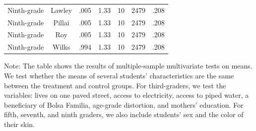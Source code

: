 \documentclass[
	article,			%
	12pt,				%
	oneside,			%
	a4paper,			%
	]{article}
\begin{document}
\begin{table}[htbp]
\begin{threeparttable}
\begin{tabular}{lcccccc}
Ninth-grade &     Lawley &       .005 &       1.33 &         10 &       2479 &       .208 \\

Ninth-grade &     Pillai &       .005 &       1.33 &         10 &       2479 &       .208 \\

Ninth-grade &        Roy &       .005 &       1.33 &         10 &       2479 &       .208 \\

Ninth-grade &      Wilks &       .994 &       1.33 &         10 &       2479 &       .208 \\

\hline
\hline
\end{tabular}  
\label{tab:mvtest}%
\begin{tablenotes}
   \fontsize{9}{9}\selectfont 
    \item 
    Note: The table shows the results of multiple-sample multivariate tests on means. We test whether the means of several students' characteristics are the same between the treatment and control groups. For third-graders, we test the variables: lives on one paved street, access to electricity, access to piped water, a beneficiary of Bolsa Familia, age-grade distortion, and mothers' education. For fifth, seventh, and ninth graders, we also include students' sex and the color of their skin. 
    \end{tablenotes}
     \end{threeparttable}
\end{table}%
\end{document}

